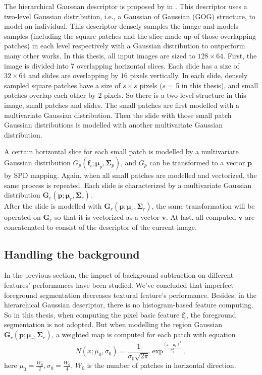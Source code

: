 The hierarchical Gaussian descriptor is proposed by in  \cite{GOG}. This descriptor uses a two-level Gaussian distribution, i.e., a Gaussian of Gaussian (GOG) structure, to model an individual. This descriptor densely samples the image and models samples (including the square patches and the slice made up of those overlapping patches) in each level respectively with a Gaussian distribution to outperform many other works. In this thesis, all input images are sized to $128\times 64$. First, the image is divided into 7 overlapping horizontal slices. Each slide has a size of $32\times 64$ and slides are overlapping by $16$ pixels vertically.  In each slide, densely sampled square patches have a size of $s\times s$ pixels ($s$ = 5 in this thesis), and small patches overlap each other by $2$ pixels. So there is a  two-level structure in this image, small patches and slides. The small patches are first modelled with a multivariate Gaussian distribution. Then the slide with those small patch Gaussian distributions is modelled with another multivariate Gaussian distribution.

A certain horizontal slice for each small patch is modelled by a multivariate Gaussian distribution $G_p(\bm{f}_i;\bm{\mu}_p,\bm{\Sigma}_p)$, and $G_p$ can be transformed to a vector $\bm{p}$ by SPD mapping. Again, when all small patches are modelled and vectorized, the same process is repeated. Each slide is characterized by a multivariate Gaussian distribution $\bm{G}_r(\bm{p};\bm{\mu}_r,\bm{\Sigma}_r)$.\\
\indent After the slide is modelled with $\bm{G}_r(\bm{p};\bm{\mu}_r,\bm{\Sigma}_r)$, the same transformation will be operated on $\bm{G}_r$ so that it is vectorized as a vector $\bm{v}$. At last, all computed $\bm{v}$ are concatenated to consist of the descriptor of the current image. 

\subsection{Handling the background}
In the previous section, the impact of background subtraction on different features' performances have been studied. We've concluded that imperfect foreground segmentation decreases textural feature's performance. Besides, in the hierarchical Gaussian descriptor, there is no histogram-based feature computing. So in this thesis, when computing the pixel basic feature $\bm{f}_i$, the foreground segmentation is not adopted. But when modelling the region Gaussian $\bm{G}_r(\bm{p};\bm{\mu}_r,\bm{\Sigma}_r)$, a weighted map is computed for each patch with equation
\begin{equation} 
N(x;\mu_0,\sigma_0) = \frac{1}{\sigma_0\sqrt{2\pi}} \exp^{\frac{(x - \mu_0)^2}{\sigma_0^2}},
\end{equation}
here $\mu_0 = \frac{W_0}{2}, \sigma_0 = \frac{W_0}{4}$, $W_0$ is the number of patches in horizontal direction.
